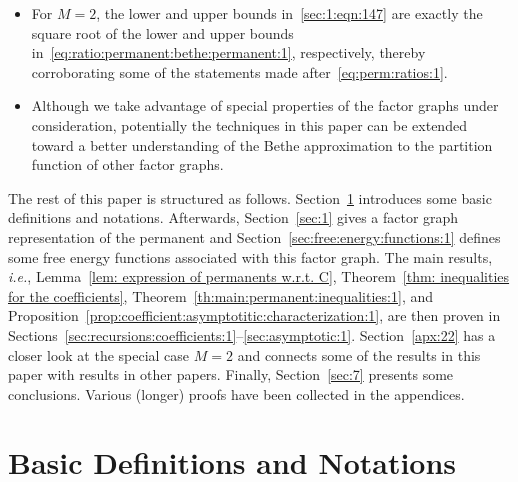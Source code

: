 \documentclass[journal,lettersize,twocolumn]{IEEEtran} %
\newcommand{\sZpp}{\mathbb{Z}_{\geq 1}}
\newcommand{\matr}[1]{ \bm{#1} }
\newcommand{\mtheta}{\matr{\theta}}
\newcommand{\ie}{\textit{i.e.}}
\begin{document}
\begin{itemize}
  Moreover, for the case where $\mtheta$ is proportional to the all-one matrix
  and where $M \in \sZpp$ is arbitrary, a basic proof of the first inequality
  in~\eqref{sec:1:eqn:147} was given in~\cite[Appendix~I]{Vontobel2013a}.
  However, presently it is not clear how to generalize this proof to other
  matrices $\mtheta$.

\item For $M = 2$, the lower and upper bounds in~\eqref{sec:1:eqn:147} are
  exactly the square root of the lower and upper bounds
  in~\eqref{eq:ratio:permanent:bethe:permanent:1}, respectively, thereby
  corroborating some of the statements made after~\eqref{eq:perm:ratios:1}.

\item Although we take advantage of special properties of the factor graphs
  under consideration, potentially the techniques in this paper can be
  extended toward a better understanding of the Bethe approximation to the
  partition function of other factor graphs.

\end{itemize}

%

The rest of this paper is structured as
follows. Section~\ref{sec:basic:definition:and:notations:1} introduces some
basic definitions and notations. Afterwards, Section~\ref{sec:1} gives a
factor graph representation of the permanent and
Section~\ref{sec:free:energy:functions:1} defines some free energy functions
associated with this factor graph. The main results, \ie, Lemma~\ref{lem:
  expression of permanents w.r.t. C}, Theorem~\ref{thm: inequalities for the
  coefficients}, Theorem~\ref{th:main:permanent:inequalities:1}, and
Proposition~\ref{prop:coefficient:asymptotitic:characterization:1}, are then
proven in
Sections~\ref{sec:recursions:coefficients:1}--\ref{sec:asymptotic:1}.
Section~\ref{apx:22} has a closer look at the special case $M = 2$ and
connects some of the results in this paper with results in other
papers. Finally, Section~\ref{sec:7} presents some conclusions. Various
(longer) proofs have been collected in the appendices.

%
%

\ifx\withclearpagecommands\x
\clearpage
\fi

\section{Basic Definitions and Notations}
\label{sec:basic:definition:and:notations:1}
\end{document}
